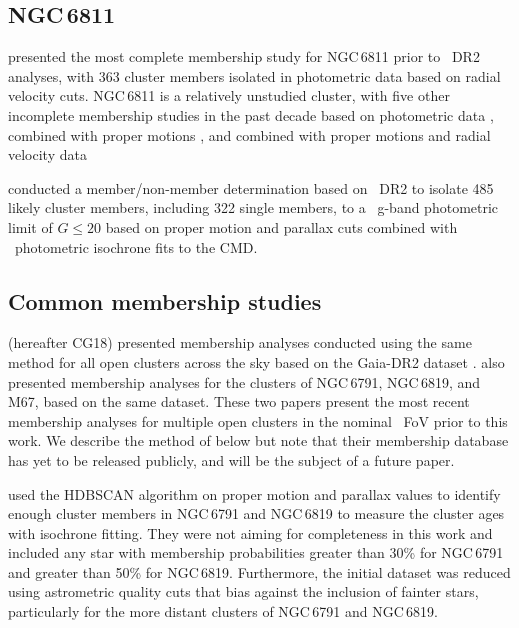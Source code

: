 \subsection{NGC\,6811}

\cite{meibom_kepler_2011} presented the most complete membership study for NGC\,6811 prior to \Gaia~DR2 analyses, with 363 cluster members isolated in photometric data based on radial velocity cuts. NGC\,6811 is a relatively unstudied cluster, with five other incomplete membership studies in the past decade based on photometric data \citep{pena_determination_2011, janes_ngc_2013}, combined with proper motions \citep{kharchenko_astrophysical_2004,kharchenko_integrated_2009}, and combined with proper motions and radial velocity data \citep{frinchaboy_open_2008}

\cite{curtis_temporary_2019} conducted a member/non-member determination based on \Gaia~DR2 to isolate 485 likely cluster members, including 322 single members, to a \Gaia~g-band photometric limit of $G\leq20$ based on proper motion and parallax cuts combined with \Gaia~photometric isochrone fits to the CMD.

\subsection{Common membership studies}

\cite{cantat-gaudin_gaia_2018} (hereafter CG18) presented membership analyses conducted using the same method for all open clusters across the sky based on the Gaia-DR2 dataset \citep{gaia_collaboration_gaia_2018-1}. \cite{choi_star_2018} also presented membership analyses for the clusters of NGC\,6791, NGC\,6819, and M67, based on the same dataset. These two papers present the most recent membership analyses for multiple open clusters in the nominal \Kepler~FoV prior to this work. We describe the method of \cite{choi_star_2018} below but note that their membership database has yet to be released publicly, and will be the subject of a future paper.

\cite{choi_star_2018} used the HDBSCAN algorithm on proper motion and parallax values to identify enough cluster members in NGC\,6791 and NGC\,6819 to measure the cluster ages with isochrone fitting. They were not aiming for completeness in this work and included any star with membership probabilities greater than 30\% for NGC\,6791 and greater than  50\% for NGC\,6819. Furthermore, the initial dataset was reduced using astrometric quality cuts that bias against the inclusion of fainter stars, particularly for the more distant clusters of NGC\,6791 and NGC\,6819.

